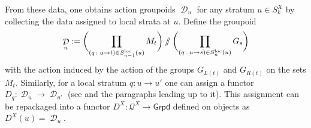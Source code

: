 \documentclass[10pt,a4paper]{amsart}
\DeclareMathOperator{\cald}{\mathcal{D}}
\newcommand{\sslash}{\mathbin{/\mkern-6mu/}}
\numberwithin{equation}{section}
\theoremstyle{definition}
\begin{document}
From these data, one obtains action groupoids $\cald_u$ for any stratum $u \in S_k^X$ by collecting the data assigned to local strata at $u$. Define the groupoid
\begin{align*}
 \cald_u := \biggl(\prod_{(q\colon u \rightarrow t) \in S_{n-1}^{\mathrm{loc}}(u)} M_t \biggr) \sslash \biggl( \prod_{(q\colon u \rightarrow s) \in S_n^{\mathrm{loc}}(u)} G_s \biggr)
\end{align*}
with the action induced by the action of the groups $G_{L(t)}$ and $G_{R(t)}$ on the sets $M_t$. Similarly, for a local stratum $q\colon u \rightarrow u'$ one can assign a functor $D_q\colon \cald_u \rightarrow \cald_{u'}$ (see \cite[Lemma 4.3]{FMM} and the paragraphs leading up to it). This assignment can be repackaged into a functor $D^X\colon \mathcal{Q}^X \rightarrow \mathsf{Grpd}$ defined on objects as $D^X(u) = \cald_u$.
\end{document}
